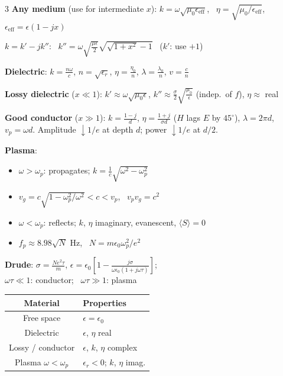 \documentclass[11pt]{article}
\begin{document}
\begin{multicols*}{3}
\textbf{Any medium} (use for intermediate $x$):
$k=\omega\sqrt{\mu_0\epsilon_\text{eff}}$, \ $\eta=\sqrt{\mu_0/\epsilon_\text{eff}}$, \ $\epsilon_\text{eff}=\epsilon\left(1-jx\right)$

$k=k'-jk''$: \ $k'' = \omega\sqrt{\tfrac{\mu\epsilon}{2}}\sqrt{\sqrt{1+x^2}-1}$ \ ($k'$: use $+1$)

\textbf{Dielectric}: $k=\frac{n\omega}{c}$, $n=\sqrt{\epsilon_r}$, $\eta=\frac{\eta_0}{n}$, $\lambda=\frac{\lambda_0}{n}$, $v=\frac cn$

\textbf{Lossy dielectric} ($x\ll1$): $k'\approx\omega\sqrt{\mu_0\epsilon}$, $k''\approx\frac\sigma2\sqrt{\frac{\mu_0}{\epsilon}}$ (indep.\ of $f$), $\eta\approx$ real

\textbf{Good conductor} ($x\gg1$): $k=\frac{1-j}{d}$, $\eta=\frac{1+j}{\sigma d}$ ($H$ lags $E$ by $45^\circ$), $\lambda=2\pi d$, $v_p=\omega d$.
Amplitude $\downarrow 1/e$ at depth $d$; power $\downarrow 1/e$ at $d/2$.

\textbf{Plasma}:
\begin{itemize}
    \item $\omega > \omega_p$: propagates; $k=\frac1c\sqrt{\omega^2-\omega_p^2}$
    \item $v_g=c\sqrt{1-\omega_p^2/\omega^2}<c<v_p$, \ $v_pv_g=c^2$
    \item $\omega < \omega_p$: reflects; $k$, $\eta$ imaginary, evanescent, $\langle S\rangle=0$
    \item $f_p\approx8.98\sqrt N$ Hz, \ $N=m\epsilon_0\omega_p^2/e^2$
\end{itemize}

\textbf{Drude}: $\sigma=\frac{Ne^2\tau}{m}$, $\epsilon=\epsilon_0\left[1-\frac{j\sigma}{\omega\epsilon_0(1+j\omega\tau)}\right]$; \\
$\omega\tau\ll1$: conductor; \ $\omega\tau\gg1$: plasma

{\small\begin{tabularx}{\linewidth}{|c|X|}
    \hline
    Material & Properties \\
    \hline
    Free space & $\epsilon=\epsilon_0$ \\
    Dielectric & $\epsilon$, $\eta$ real \\
    Lossy / conductor & $\epsilon$, $k$, $\eta$ complex \\
    Plasma $\omega<\omega_p$ & $\epsilon_r<0$; $k$, $\eta$ imag. \\
    \hline
\end{tabularx}}

\end{multicols*}
\end{document}
